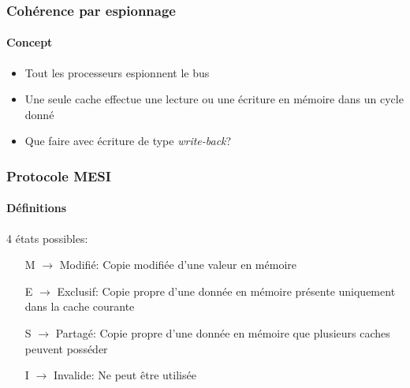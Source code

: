 \documentclass{beamer}
\begin{document}
\begin{frame}
\frametitle{Cohérence par espionnage}
\framesubtitle{Concept}
\begin{itemize}
\item Tout les processeurs espionnent le bus
\item Une seule cache effectue une lecture ou une écriture en mémoire dans un cycle donné
\item Que faire avec écriture de type \textit{write-back}?
\end{itemize}
\end{frame}

\begin{frame}
\frametitle{Protocole MESI}
\framesubtitle{Définitions}
4 états possibles: 
\begin{itemize}
\item[M] $\rightarrow$ Modifié: Copie modifiée d'une valeur en mémoire
\item[E] $\rightarrow$ Exclusif: Copie propre d'une donnée en mémoire présente uniquement dans la cache courante
\item[S] $\rightarrow$ Partagé: Copie propre d'une donnée en mémoire que plusieurs caches peuvent posséder
\item[I] $\rightarrow$ Invalide: Ne peut être utilisée
\end{itemize}
\end{frame}
\end{document}

